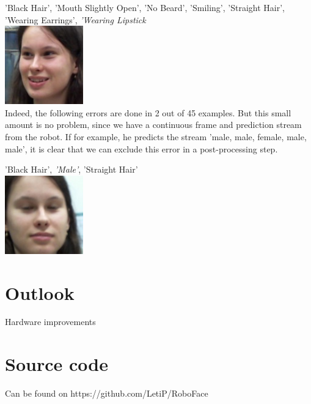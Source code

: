 \documentclass[12.5pt]{scrartcl}
\begin{document}
	'Black Hair', 'Mouth Slightly Open', 'No Beard', 'Smiling', 'Straight Hair', 'Wearing Earrings', \emph{'Wearing Lipstick}
	 \\
	\includegraphics[height=0.1\textheight]{images/leti_normalised24}\\
	
	Indeed, the following errors are done in 2 out of 45 examples. But this small amount is no problem, since we have a continuous frame and prediction stream from the robot. If for example, he predicts the stream 'male, male, female, male, male', it is clear that we can exclude this error in a post-processing step.
	
	'Black Hair', \emph{'Male'}, 'Straight Hair'\\
	\includegraphics[height=0.2\textheight]{images/leti_normalised0}
	\section{Outlook}
	Hardware improvements
	\section{Source code}
	Can be found on	https://github.com/LetiP/RoboFace
	
\end{document}
